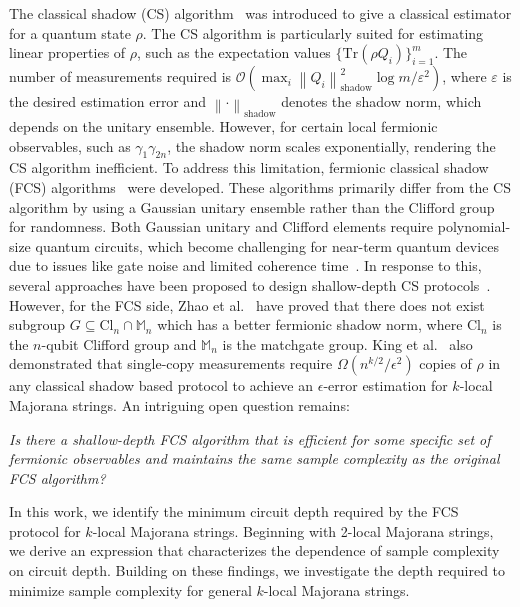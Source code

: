 \documentclass[showpacs,onecolumn,aps,prx,long bibliography,superscriptaddress,notitlepage]{revtex4-1}
\newcommand{\vabs}[1]{\left\| #1 \right\|}
\newcommand{\cbra}[1]{\{ #1 \}}
\newcommand{\pbra}[1]{\left( #1 \right)}
\newcommand{\tra}[1]{\text{Tr}\left( #1 \right)}
\newcommand{\Ord}[1]{\mathcal{O}\left( #1 \right)}
\newcommand{\Mbb}{\mathbb{M}}
\begin{document}
The classical shadow (CS) algorithm~\cite{huang2020predicting} was introduced to give a classical estimator for a quantum state $\rho$. The CS algorithm is particularly suited for estimating linear properties of $\rho$, such as the expectation values $\cbra{\tra{\rho Q_i}}_{i=1}^m$. The number of measurements required is $\Ord{\max_i \vabs{Q_i}^2_{\text{shadow}} \log m / \varepsilon^2}$, where $\varepsilon$ is the desired estimation error and $\vabs{\cdot}_{\text{shadow}}$ denotes the shadow norm, which depends on the unitary ensemble. 
However, for certain local fermionic observables, such as $\gamma_1\gamma_{2n}$, the shadow norm scales exponentially, rendering the CS algorithm inefficient. 
To address this limitation, fermionic classical shadow (FCS) algorithms~\cite{bonet2020nearly, Zhao21Fermionic, low2022classical, wan2022matchgate, zhao2024group,heyraud2024unified} were developed. These algorithms primarily differ from the CS algorithm by using a Gaussian unitary ensemble rather than the Clifford group for randomness. Both Gaussian unitary and Clifford elements require polynomial-size quantum circuits, which become challenging for near-term quantum devices due to issues like gate noise and limited coherence time~\cite{patel2008optimal, jiang2020optimal, jiang2018quantum, arute2019quantum, Wu21Strong, cao2023generation}. In response to this, several approaches have been proposed to design shallow-depth CS protocols~\cite{bertoni2024shallow, schuster2024random, rozon2024optimal,ma2024construct}. However, for the FCS side,
Zhao et al.~\cite{Zhao21Fermionic} have proved that there does not exist subgroup $G\subseteq \text{Cl}_n \cap \Mbb_n$ which has a better fermionic shadow norm, where Cl$_n$ is the $n$-qubit Clifford group and $\Mbb_n$ is the matchgate group.  
King et al.~\cite{king2024triply} also demonstrated that single-copy measurements require $\Omega\pbra{n^{k/2}/\epsilon^2}$ copies of $\rho$ in any classical shadow based protocol to achieve an $\epsilon$-error estimation for $k$-local Majorana strings. 
An intriguing open question remains:
\begin{center}
  \textit{Is there a shallow-depth FCS algorithm that is efficient for some specific set of fermionic observables and maintains the same sample complexity as the original FCS algorithm?}  
\end{center}




In this work, we identify the minimum circuit depth required by the FCS protocol for $k$-local Majorana strings.
 Beginning with 2-local Majorana strings, we derive an expression that characterizes the dependence of sample complexity on circuit depth. Building on these findings, we investigate the depth required to minimize sample complexity for general $k$-local Majorana strings.
\end{document}
